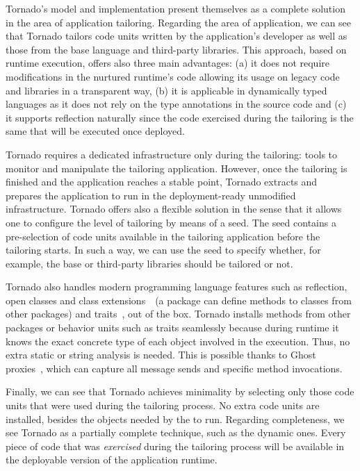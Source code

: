 Tornado's model and implementation present themselves as a complete solution in the area of application tailoring. Regarding the area of application, we can see that Tornado tailors code units written by the application's developer as well as those from the base language and third-party libraries. This approach, based on runtime execution, offers also three main advantages: (a) it does not require modifications in the nurtured runtime's code allowing its usage on legacy code and libraries in a transparent way, (b) it is applicable in dynamically typed languages as it does not rely on the type annotations in the source code and (c) it supports reflection naturally since the code exercised during the tailoring is the same that will be executed once deployed.

Tornado requires a dedicated infrastructure only during the tailoring: tools to monitor and manipulate the tailoring application. However, once the tailoring is finished and the application reaches a stable point, Tornado extracts and prepares the application to run in the deployment-ready unmodified infrastructure. Tornado offers also a flexible solution in the sense that it allows one to configure the level of tailoring by means of a seed. The seed contains a pre-selection of code units available in the tailoring application before the tailoring starts. In such a way, we can use the seed to specify whether, for example, the base or third-party libraries should be tailored or not.

Tornado also handles modern programming language features such as reflection, open classes and class extensions~\cite{Berg03a}~(\ie a package can define methods to classes from other packages) and traits~\cite{Scha03a}, out of the box. Tornado installs methods from other packages or behavior units such as traits seamlessly because during runtime it knows the exact concrete type of each object involved in the execution. Thus, no extra static or string analysis is needed. This is possible thanks to Ghost proxies~\cite{Mart14z}, which can capture all message sends and specific method invocations.

Finally, we can see that Tornado achieves minimality by selecting only those code units that were used during the tailoring process. No extra code units are installed, besides the objects needed by the \VM to run. Regarding completeness, we see Tornado as a partially complete technique, such as the dynamic ones. Every piece of code that was \emph{exercised} during the tailoring process will be available in the deployable version of the application runtime.

